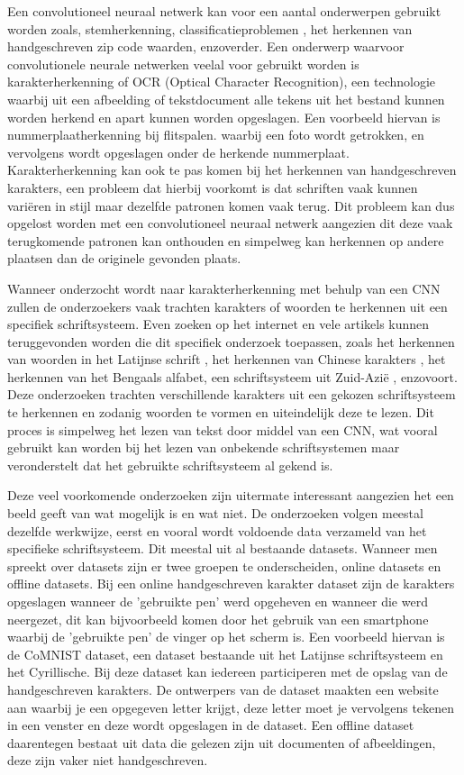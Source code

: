 Een convolutioneel neuraal netwerk kan voor een aantal onderwerpen gebruikt worden zoals, stemherkenning, classificatieproblemen \autocite{Yann1997}, het herkennen van handgeschreven zip code waarden\autocite{J.S.}, enzoverder.
Een onderwerp waarvoor convolutionele neurale netwerken veelal voor gebruikt worden is karakterherkenning of OCR (Optical Character Recognition), een technologie waarbij uit een afbeelding of tekstdocument alle tekens uit het bestand kunnen worden herkend en apart kunnen worden opgeslagen.
Een voorbeeld hiervan is nummerplaatherkenning bij flitspalen. waarbij een foto wordt getrokken, en vervolgens wordt opgeslagen onder de herkende nummerplaat.
Karakterherkenning kan ook te pas komen bij het herkennen van handgeschreven karakters, een probleem dat hierbij voorkomt is dat schriften vaak kunnen variëren in stijl maar dezelfde patronen komen vaak terug.
Dit probleem kan dus opgelost worden met een convolutioneel neuraal netwerk aangezien dit deze vaak terugkomende patronen kan onthouden en simpelweg kan herkennen op andere plaatsen dan de originele gevonden plaats.

Wanneer onderzocht wordt naar karakterherkenning met behulp van een CNN zullen de onderzoekers vaak trachten karakters of woorden te herkennen uit een specifiek schriftsysteem. \autocite{Yoshua}\autocite{Yann}
Even zoeken op het internet en vele artikels kunnen teruggevonden worden die dit specifiek onderzoek toepassen, zoals het herkennen van woorden in het Latijnse schrift \autocite{Aiquan2012}, het herkennen van Chinese karakters \autocite{Weixin}, het herkennen van het Bengaals alfabet, een schriftsysteem uit Zuid-Azië \autocite{Mahbubar2015}, enzovoort.
Deze onderzoeken trachten verschillende karakters uit een gekozen schriftsysteem te herkennen en zodanig woorden te vormen en uiteindelijk deze te lezen. Dit proces is simpelweg het lezen van tekst door middel van een CNN, wat vooral gebruikt kan worden bij het lezen van onbekende schriftsystemen maar veronderstelt dat het gebruikte schriftsysteem al gekend is.

Deze veel voorkomende onderzoeken zijn uitermate interessant aangezien het een beeld geeft van wat mogelijk is en wat niet.
De onderzoeken volgen meestal dezelfde werkwijze, eerst en vooral wordt voldoende data verzameld van het specifieke schriftsysteem. Dit meestal uit al bestaande datasets.
Wanneer men spreekt over datasets zijn er twee groepen te onderscheiden, online datasets en offline datasets.
Bij een online handgeschreven karakter dataset zijn de karakters opgeslagen wanneer de 'gebruikte pen' werd opgeheven en wanneer die werd neergezet, dit kan bijvoorbeeld komen door het gebruik van een smartphone waarbij de 'gebruikte pen' de vinger op het scherm is. \autocite{Cheng-Lin2011}
Een voorbeeld hiervan is de CoMNIST dataset, een dataset bestaande uit het Latijnse schriftsysteem en het Cyrillische. Bij deze dataset kan iedereen participeren met de opslag van de handgeschreven karakters.
De ontwerpers van de dataset maakten een website aan waarbij je een opgegeven letter krijgt, deze letter moet je vervolgens tekenen in een venster en deze wordt opgeslagen in de dataset.
Een offline dataset daarentegen bestaat uit data die gelezen zijn uit documenten of afbeeldingen, deze zijn vaker niet handgeschreven.


